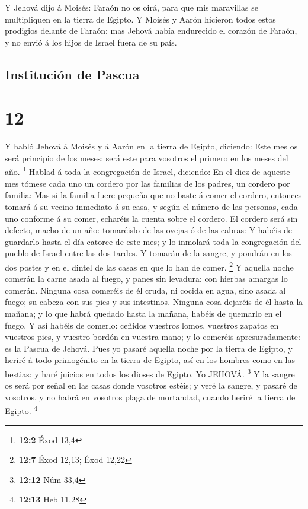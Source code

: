  Y Jehová dijo á Moisés: Faraón no os oirá, para que mis
maravillas se multipliquen en la tierra de Egipto.  Y
Moisés y Aarón hicieron todos estos prodigios delante de Faraón: mas
Jehová había endurecido el corazón de Faraón, y no envió á los hijos de
Israel fuera de su país.

\hypertarget{instituciuxf3n-de-pascua}{%
\subsection{Institución de Pascua}\label{instituciuxf3n-de-pascua}}

\hypertarget{section-11}{%
\section{12}\label{section-11}}

 Y habló Jehová á Moisés y á Aarón en la tierra de Egipto,
diciendo:  Este mes os será principio de los meses; será
este para vosotros el primero en los meses del año. \footnote{\textbf{12:2}
  Éxod 13,4}  Hablad á toda la congregación de Israel,
diciendo: En el diez de aqueste mes tómese cada uno un cordero por las
familias de los padres, un cordero por familia:  Mas si la
familia fuere pequeña que no baste á comer el cordero, entonces tomará á
su vecino inmediato á su casa, y según el número de las personas, cada
uno conforme á su comer, echaréis la cuenta sobre el cordero.
 El cordero será sin defecto, macho de un año: tomaréislo de
las ovejas ó de las cabras:  Y habéis de guardarlo hasta el
día catorce de este mes; y lo inmolará toda la congregación del pueblo
de Israel entre las dos tardes.  Y tomarán de la sangre, y
pondrán en los dos postes y en el dintel de las casas en que lo han de
comer. \footnote{\textbf{12:7} Éxod 12,13; Éxod 12,22}  Y
aquella noche comerán la carne asada al fuego, y panes sin levadura: con
hierbas amargas lo comerán.  Ninguna cosa comeréis de él
cruda, ni cocida en agua, sino asada al fuego; su cabeza con sus pies y
sus intestinos.  Ninguna cosa dejaréis de él hasta la
mañana; y lo que habrá quedado hasta la mañana, habéis de quemarlo en el
fuego.  Y así habéis de comerlo: ceñidos vuestros lomos,
vuestros zapatos en vuestros pies, y vuestro bordón en vuestra mano; y
lo comeréis apresuradamente: es la Pascua de Jehová.  Pues
yo pasaré aquella noche por la tierra de Egipto, y heriré á todo
primogénito en la tierra de Egipto, así en los hombres como en las
bestias: y haré juicios en todos los dioses de Egipto. Yo JEHOVÁ.
\footnote{\textbf{12:12} Núm 33,4}  Y la sangre os será por
señal en las casas donde vosotros estéis; y veré la sangre, y pasaré de
vosotros, y no habrá en vosotros plaga de mortandad, cuando heriré la
tierra de Egipto. \footnote{\textbf{12:13} Heb 11,28}

